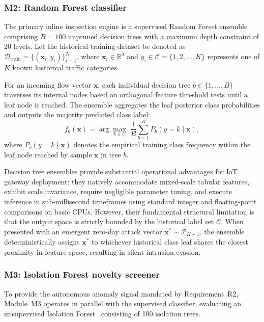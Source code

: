 \subsubsection{M2: Random Forest classifier}
\label{subsubsec:m2_rf_classifier}
The primary inline inspection engine is a supervised Random Forest ensemble~\cite{breiman2001random} comprising $B = 100$ unpruned decision trees with a maximum depth constraint of 20 levels. Let the historical training dataset be denoted as $\mathcal{D}_{\text{train}} = \{(\mathbf{x}_i, y_i)\}_{i=1}^{N}$, where $\mathbf{x}_i \in \mathbb{R}^d$ and $y_i \in \mathcal{C} = \{1, 2, \dots, K\}$ represents one of $K$ known historical traffic categories.

For an incoming flow vector $\mathbf{x}$, each individual decision tree $b \in \{1, \dots, B\}$ traverses its internal nodes based on orthogonal feature threshold tests until a leaf node is reached. The ensemble aggregates the leaf posterior class probabilities and outputs the majority predicted class label:
\begin{equation}
f_\theta(\mathbf{x}) = \arg\max_{k \in \mathcal{C}} \; \frac{1}{B} \sum_{b=1}^{B} P_b(y = k \mid \mathbf{x}),
\label{eq:rf_prediction}
\end{equation}
where $P_b(y = k \mid \mathbf{x})$ denotes the empirical training class frequency within the leaf node reached by sample $\mathbf{x}$ in tree $b$. 

Decision tree ensembles provide substantial operational advantages for IoT gateway deployment: they natively accommodate mixed-scale tabular features, exhibit scale invariance, require negligible parameter tuning, and execute inference in sub-millisecond timeframes using standard integer and floating-point comparisons on basic CPUs. However, their fundamental structural limitation is that the output space is strictly bounded by the historical label set $\mathcal{C}$. When presented with an emergent zero-day attack vector $\mathbf{x}^* \sim \mathcal{P}_{K+1}$, the ensemble deterministically assigns $\mathbf{x}^*$ to whichever historical class leaf shares the closest proximity in feature space, resulting in silent intrusion evasion.

\subsubsection{M3: Isolation Forest novelty screener}
\label{subsubsec:m3_isolation_screener}
To provide the autonomous anomaly signal mandated by Requirement~R2, Module~M3 operates in parallel with the supervised classifier, evaluating an unsupervised Isolation Forest~\cite{liu2008isolation} consisting of 100 isolation trees.

